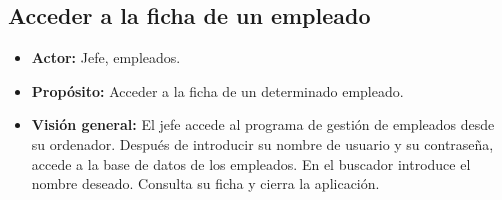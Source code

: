 \documentclass[spanish,a4paper,11pt, twoside]{report}	%
\begin{document}
		

	\subsection{Acceder a la ficha de un empleado}		
			\begin{itemize}
			\item \textbf{Actor:} Jefe, empleados.
			\item \textbf{Propósito: } Acceder a la ficha de un determinado empleado.
			\item \textbf{Visión general:} El jefe accede al programa de gestión de empleados desde su ordenador. Después de introducir su nombre de usuario y su contraseña, accede a la base de datos de los empleados. En el buscador introduce el nombre deseado. Consulta su ficha y cierra la aplicación.


\end{itemize}
\end{document}
